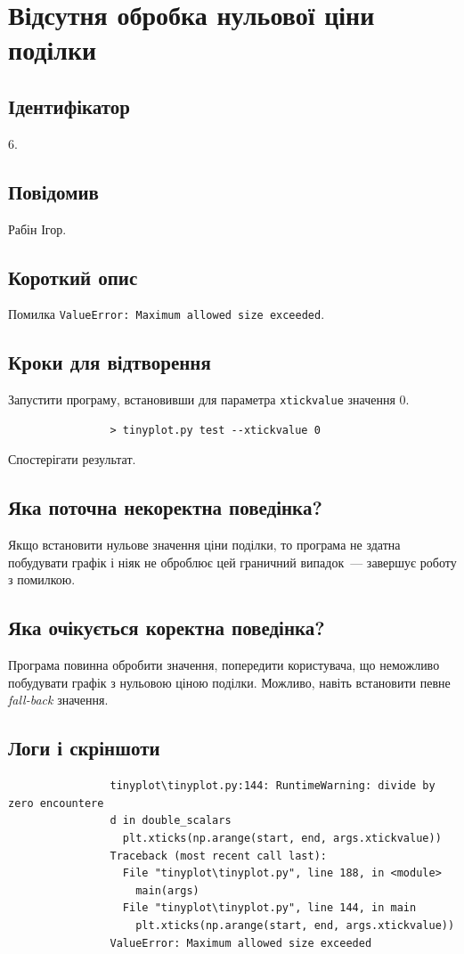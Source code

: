 \documentclass[a4paper,oneside,DIV=12,12pt]{scrartcl}
\begin{document}
	\section{Відсутня обробка нульової ціни поділки}
		\subsection{Ідентифікатор}
			6.
		
		\subsection{Повідомив}
			Рабін Ігор.
			
		\subsection{Короткий опис}
			Помилка \verb|ValueError: Maximum allowed size exceeded|.
			
		\subsection{Кроки для відтворення}
			\begin{steps}
				\item Запустити програму, встановивши для параметра \texttt{xtickvalue} значення 0.
				\begin{lstlisting}
				> tinyplot.py test --xtickvalue 0
				\end{lstlisting}
				
				\item Спостерігати результат.
			\end{steps}
			
		\subsection{Яка поточна некоректна поведінка?}
			Якщо встановити нульове значення ціни поділки, то програма не здатна побудувати графік і ніяк не оброблює цей граничний випадок~— завершує роботу з помилкою.
		\subsection{Яка очікується коректна поведінка?}
			Програма повинна обробити значення, попередити користувача, що неможливо побудувати графік з нульовою ціною поділки. Можливо, навіть встановити певне \emph{fall-back} значення.
			
		\subsection{Логи і скріншоти}
			\begin{lstlisting}
				tinyplot\tinyplot.py:144: RuntimeWarning: divide by zero encountere
				d in double_scalars
				  plt.xticks(np.arange(start, end, args.xtickvalue))
				Traceback (most recent call last):
				  File "tinyplot\tinyplot.py", line 188, in <module>
					main(args)
				  File "tinyplot\tinyplot.py", line 144, in main
					plt.xticks(np.arange(start, end, args.xtickvalue))
				ValueError: Maximum allowed size exceeded
			\end{lstlisting}
\end{document}

